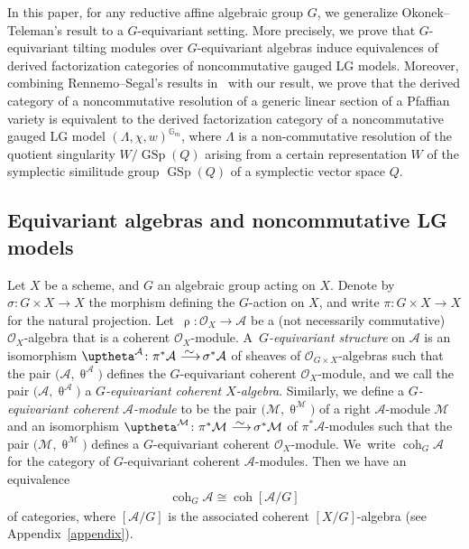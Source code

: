 \documentclass[10pt,a4paper]{amsart}
\numberwithin{equation}{section}
\newcommand{\coh}{\operatorname{coh}}
\newcommand{\GSp}{\operatorname{GSp}}
\newcommand{\cA}{\mathcal{A}}
\newcommand{\cM}{\mathcal{M}}
\newcommand{\cO}{\mathcal{O}}
\newcommand{\simto}{\,\,\,\,\raisebox{4pt}{$\sim$}{\kern -1.1em \longrightarrow}\,}
\begin{document}
In this paper, for any reductive affine algebraic group $G$,
we generalize Okonek--Teleman's result to a $G$-equivariant setting. More precisely, we prove that $G$-equivariant tilting modules over $G$-equivariant algebras induce equivalences of derived factorization categories of noncommutative gauged LG models. Moreover, combining Rennemo--Segal's results in~\cite{rs} with our result, we prove that the derived category of a noncommutative resolution of a generic linear section of a Pfaffian variety is equivalent to the derived factorization category of a noncommutative gauged LG model $(\Lambda, \chi, w)^{\mathbb{G}_m}$, where $\Lambda$ is a non-commutative resolution of the quotient singularity $W/\GSp(Q)$ arising from a certain representation $W$ of the symplectic similitude group $\GSp(Q)$ of a symplectic vector space $Q$.

\subsection{Equivariant algebras and noncommutative LG models}

Let $X$ be a scheme, and $G$ an algebraic group acting on $X$. Denote by $\sigma\colon G\times X\to X$ the morphism defining the $G$-action on $X$, and write $\pi\colon G\times X\to X$ for the natural projection. Let~$\uprho\colon \cO_X\to\cA$ be a (not necessarily commutative) $\cO_X$-algebra that is a coherent $\cO_X$-module. A~{\it $G$-equivariant structure} on $\cA$ is an isomorphism $\uptheta^{\cA}\colon\pi^*\cA\simto\sigma^*\cA$ of sheaves of $\cO_{G\times X}$-algebras such that the pair $\big(\cA,\uptheta^{\cA}\big)$ defines the $G$-equivariant coherent $\cO_X$-module, and we call the pair $\big(\cA,\uptheta^{\cA}\big)$ a {\it $G$-equivariant coherent $X$-algebra}. Similarly, we define a {\it $G$-equivariant coherent $\cA$-module} to be the pair $\big(\cM,\uptheta^{\cM}\big)$ of a right $\cA$-module $\cM$ and an isomorphism $\uptheta^{\cM}\colon\pi^*\cM\simto\sigma^*\cM$ of $\pi^*\cA$-modules such that the pair $\big(\cM,\uptheta^{\cM}\big)$ defines a $G$-equivariant coherent $\cO_X$-module. We~write $\coh_G\cA$ for the category of $G$-equivariant coherent $\cA$-modules. Then we have an equivalence
\begin{gather*}
\coh_G\cA\cong\coh[\cA/G]
\end{gather*}
of categories, where $[\cA/G]$ is the associated coherent $[X/G]$-algebra (see Appendix~\ref{appendix}).
\end{document}
